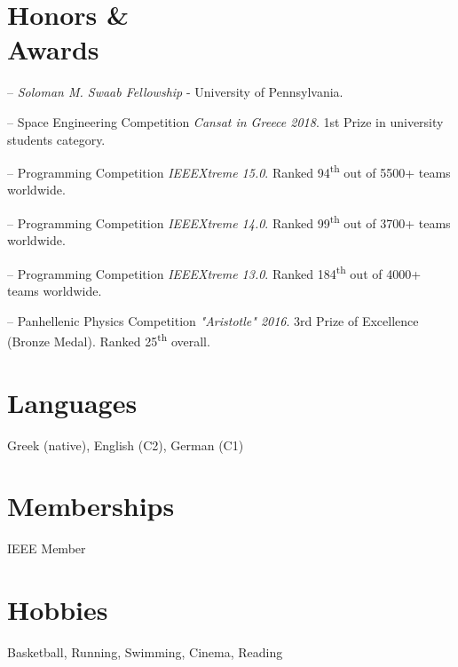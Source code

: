 \documentclass[margin, 10.5pt]{res}
\begin{document}
\begin{resume}
\section{Honors \& \\ Awards} 
\begin{compactitem}
    \item[--] \emph{Soloman M. Swaab Fellowship} - University of Pennsylvania.
	\item[--] Space Engineering Competition \emph{Cansat in Greece 2018}. 1st Prize in university students category.
    \item[--] Programming Competition \emph{IEEEXtreme 15.0}. Ranked 94\textsuperscript{th} out of 5500+ teams worldwide.
    \item[--] Programming Competition \emph{IEEEXtreme 14.0}. Ranked 99\textsuperscript{th} out of 3700+ teams worldwide.
    \item[--] Programming Competition \emph{IEEEXtreme 13.0}. Ranked 184\textsuperscript{th} out of 4000+ teams worldwide.
    \item[--] Panhellenic Physics Competition \emph{"Aristotle" 2016}. 3rd Prize of Excellence (Bronze Medal). Ranked 25\textsuperscript{th} overall.

\end{compactitem}


\section{Languages} Greek (native), English (C2), German (C1)

\section{Memberships} IEEE Member

\begin{comment}
\section{References \\ available \\ upon request}

Nectarios Koziris \hfill (Prof. at NTUA, \texttt{nkoziris@cslab.ece.ntua.gr)} \\

\end{comment}

\section{Hobbies}
Basketball, Running, Swimming, Cinema, Reading


\end{resume}
\end{document}
